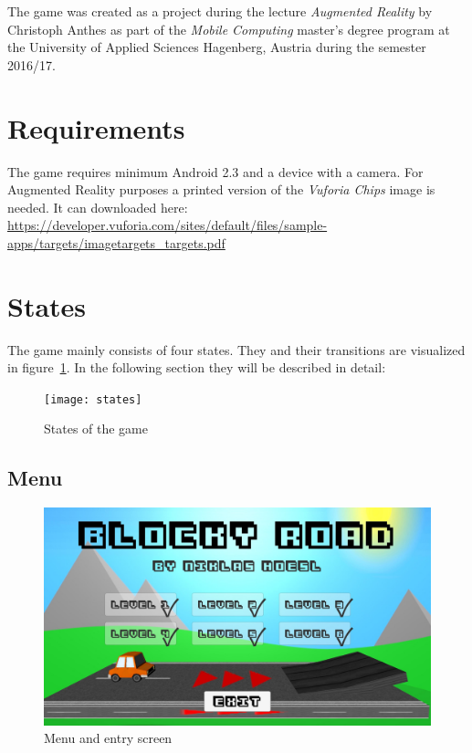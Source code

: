 \documentclass{vgtc}                          %
\begin{document}
The game was created as a project during the lecture \textit{Augmented Reality} by Christoph Anthes as part of the \textit{Mobile Computing} master's degree program at the University of Applied Sciences Hagenberg, Austria during the semester 2016/17. 

\section{Requirements}
The game requires minimum Android 2.3 and a device with a camera. For Augmented Reality purposes a printed version of the \textit{Vuforia Chips} image is needed. It can downloaded here: \url{https://developer.vuforia.com/sites/default/files/sample-apps/targets/imagetargets_targets.pdf}

\section{States} 
 
The game mainly consists of four states. They and their transitions are visualized in figure~\ref{fig:states}. In the following section they will be described in detail:
 
\begin{figure}[tb]
	\centering
	\texttt{[image: states]}
	\caption{States of the game}
	\label{fig:states}
\end{figure} 
 
\subsection{Menu}

\begin{figure}[tb]
	\centering
	\includegraphics[width=\columnwidth]{menu}
	\caption{Menu and entry screen}
	\label{fig:menu}
\end{figure}
\end{document}
